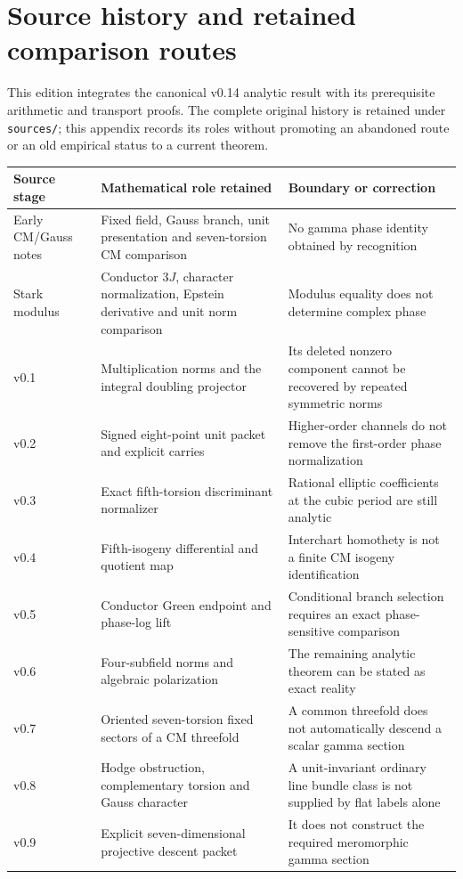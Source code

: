 \section{Source history and retained comparison routes}\label{sec:history}
This edition integrates the canonical v0.14 analytic result with its prerequisite arithmetic and transport proofs. The complete original history is retained under \texttt{sources/}; this appendix records its roles without promoting an abandoned route or an old empirical status to a current theorem.

\begin{longtable}{p{.14\linewidth}p{.43\linewidth}p{.34\linewidth}}
\toprule Source stage & Mathematical role retained & Boundary or correction\\\midrule\endhead
Early CM/Gauss notes & Fixed field, Gauss branch, unit presentation and seven-torsion CM comparison & No gamma phase identity obtained by recognition\\
Stark modulus & Conductor $3J$, character normalization, Epstein derivative and unit norm comparison & Modulus equality does not determine complex phase\\
v0.1 & Multiplication norms and the integral doubling projector & Its deleted nonzero component cannot be recovered by repeated symmetric norms\\
v0.2 & Signed eight-point unit packet and explicit carries & Higher-order channels do not remove the first-order phase normalization\\
v0.3 & Exact fifth-torsion discriminant normalizer & Rational elliptic coefficients at the cubic period are still analytic\\
v0.4 & Fifth-isogeny differential and quotient map & Interchart homothety is not a finite CM isogeny identification\\
v0.5 & Conductor Green endpoint and phase-log lift & Conditional branch selection requires an exact phase-sensitive comparison\\
v0.6 & Four-subfield norms and algebraic polarization & The remaining analytic theorem can be stated as exact reality\\
v0.7 & Oriented seven-torsion fixed sectors of a CM threefold & A common threefold does not automatically descend a scalar gamma section\\
v0.8 & Hodge obstruction, complementary torsion and Gauss character & A unit-invariant ordinary line bundle class is not supplied by flat labels alone\\
v0.9 & Explicit seven-dimensional projective descent packet & It does not construct the required meromorphic gamma section\\

\end{longtable}
